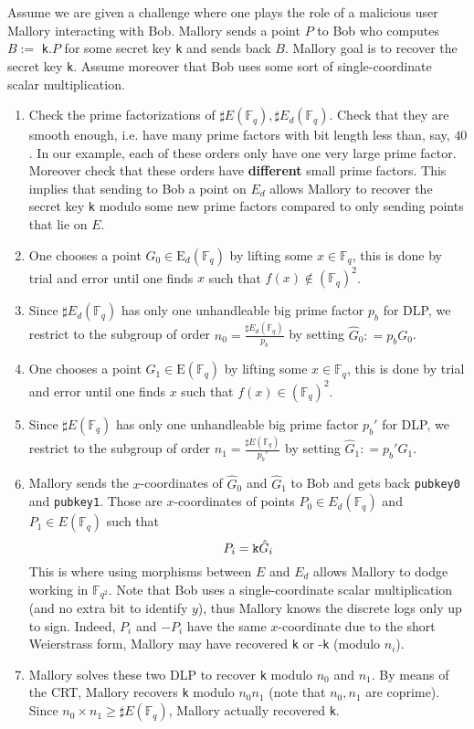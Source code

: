 \documentclass[10pt]{article}
\theoremstyle{definition}
\newcommand{\F}{\mathbb{F}}
\newcommand{\E}{\textrm{E}}
\begin{document}
\noindent Assume we are given a challenge where one plays the role of a malicious user Mallory interacting with Bob.
Mallory sends a point $P$ to Bob who computes $B := $ \verb|k|$.P$ for some secret key \verb|k| and sends back $B$.
Mallory goal is to recover the secret key \verb|k|.
Assume moreover that Bob uses some sort of single-coordinate scalar multiplication.

\begin{enumerate}
\item Check the prime factorizations of $\sharp{}E(\F_q), \sharp{}E_d(\F_q)$.
Check that they are smooth enough, i.e. have many prime factors with bit length less than, say, $40$.
In our example, each of these orders only have one very large prime factor.
Moreover check that these orders have \textbf{different} small prime factors.
This implies that sending to Bob a point on $E_d$ allows Mallory to recover the secret key \verb|k| modulo some new prime factors compared to only sending points that lie on $E$.
\item One chooses a point $G_0 \in \E_d(\F_q)$ by lifting some $x\in \F_q$, this is done by trial and error until one finds $x$ such that $f(x) \notin (\F_q)^2$. 
\item Since $\sharp{}E_d(\F_q)$ has only one unhandleable big prime factor $p_b$ for DLP, we restrict to the subgroup of order $n_0 = \frac{\sharp{}E_d(\F_q)}{p_b}$ by setting $\hat{G}_0 : = p_b G_0$.
\item One chooses a point $G_1 \in \E(\F_q)$ by lifting some $x\in \F_q$, this is done by trial and error until one finds $x$ such that $f(x) \in (\F_q)^2$. 
\item Since $\sharp{}E(\F_q)$ has only one unhandleable big prime factor $p_b'$ for DLP, we restrict to the subgroup of order $n_1 = \frac{\sharp{}E(\F_q)}{p_b'}$ by setting $\hat{G}_1 : = p_b' G_1$.
\item Mallory sends the $x$-coordinates of $\hat{G}_0$ and $\hat{G}_1$ to Bob and gets back \verb|pubkey0| and \verb|pubkey1|.
Those are $x$-coordinates of points $P_0 \in E_d(\F_q)$ and $P_1 \in E(\F_q)$ such that 
\[ P_i = \verb|k|\hat{G}_i \]
This is where using morphisms between $E$ and $E_d$ allows Mallory to dodge working in $\F_{q^2}$.
Note that Bob uses a single-coordinate scalar multiplication (and no extra bit to identify $y$), thus Mallory knows the discrete logs only up to sign. 
Indeed, $P_i$ and $-P_i$ have the same $x$-coordinate due to the short Weierstrass form, Mallory may have recovered \verb|k| or -\verb|k| (modulo $n_i$).
\item Mallory solves these two DLP to recover \verb|k| modulo $n_0$  and $n_1$.
By means of the CRT, Mallory recovers \verb|k| modulo $n_0n_1$ (note that $n_0, n_1$ are coprime).
Since $n_0 \times n_1 \geq \sharp{}E(\F_q)$, Mallory  actually recovered \verb|k|.


\end{enumerate}
\end{document}
